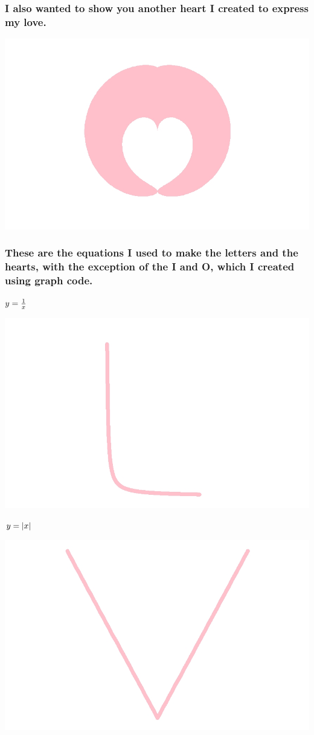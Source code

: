 \documentclass[
]{article}
\begin{document}
\hypertarget{i-also-wanted-to-show-you-another-heart-i-created-to-express-my-love.}{%
\subsubsection{I also wanted to show you another heart I created to
express my
love.}\label{i-also-wanted-to-show-you-another-heart-i-created-to-express-my-love.}}

\includegraphics[width=0.5\linewidth]{Heart1}

\hypertarget{these-are-the-equations-i-used-to-make-the-letters-and-the-hearts-with-the-exception-of-the-i-and-o-which-i-created-using-graph-code.}{%
\subsubsection{These are the equations I used to make the letters and
the hearts, with the exception of the I and O, which I created using
graph
code.}\label{these-are-the-equations-i-used-to-make-the-letters-and-the-hearts-with-the-exception-of-the-i-and-o-which-i-created-using-graph-code.}}

\(\LARGE y = \frac{1}{x} \hspace{1cm}\)

\includegraphics[width=0.5\linewidth]{L}

\(\LARGE y=\lvert x\rvert \hspace{3cm}\)

\includegraphics[width=0.5\linewidth]{V}
\end{document}
